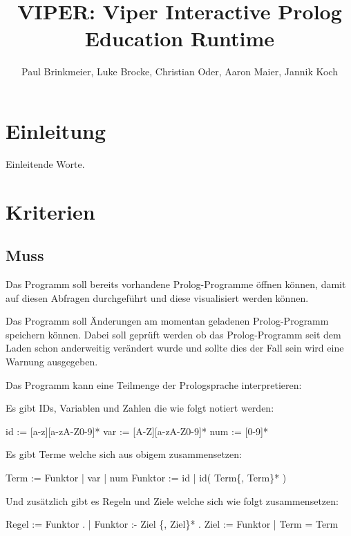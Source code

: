 \documentclass[parskip=full,11pt,twoside]{scrartcl}
\title{VIPER: Viper Interactive Prolog Education Runtime}
\author{Paul Brinkmeier, Luke Brocke, Christian Oder, Aaron Maier, Jannik Koch}
\begin{document}
\maketitle

\section{Einleitung}

Einleitende Worte.

\pagebreak
\section{Kriterien}

\subsection{Muss}


Das Programm soll bereits vorhandene Prolog-Programme öffnen können, damit auf diesen Abfragen durchgeführt und diese visualisiert werden können.


Das Programm soll Änderungen am momentan geladenen Prolog-Programm speichern können. Dabei soll geprüft werden ob das Prolog-Programm seit dem Laden schon anderweitig verändert wurde und sollte dies der Fall sein wird eine Warnung ausgegeben.


Das Programm kann eine Teilmenge der Prologsprache interpretieren:

Es gibt IDs, Variablen und Zahlen die wie folgt notiert werden:

id := [a-z][a-zA-Z0-9]*\newline
var := [A-Z][a-zA-Z0-9]*\newline
num := [0-9]*

Es gibt Terme welche sich aus obigem zusammensetzen:

Term := Funktor | var | num\newline
Funktor := id | id( Term\{, Term\}* )

Und zusätzlich gibt es Regeln und Ziele welche sich wie folgt zusammensetzen:

Regel := Funktor . | Funktor :- Ziel \{, Ziel\}* .\newline
Ziel := Funktor | Term = Term
\end{document}
